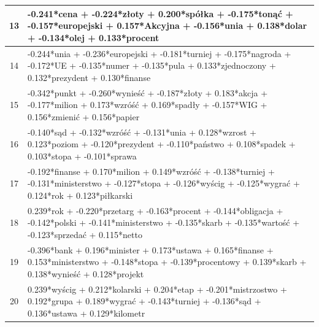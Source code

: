 \documentclass[11pt,a4paper]{article}
\begin{document}
\begin{table}[h]
\begin{tabular}{|c|>{\footnotesize}p{\linewidth}|}
13 & -0.241*cena + -0.224*złoty + 0.200*spółka + -0.175*tonąć + -0.157*europejski + 0.157*Akcyjna + -0.156*unia + 0.138*dolar + -0.134*olej + 0.133*procent\\\hline
14 & -0.244*unia + -0.236*europejski + -0.181*turniej + -0.175*nagroda + -0.172*UE + -0.135*numer + -0.135*pula + 0.133*zjednoczony + 0.132*prezydent + 0.130*finanse\\\hline
15 & -0.342*punkt + -0.260*wynieść + -0.187*złoty + 0.183*akcja + -0.177*milion + 0.173*wzróść + 0.169*spadły + -0.157*WIG + 0.156*zmienić + 0.156*papier\\\hline
16 & -0.140*sąd + -0.132*wzróść + -0.131*unia + 0.128*wzrost + 0.123*poziom + -0.120*prezydent + -0.110*państwo + 0.108*spadek + 0.103*stopa + -0.101*sprawa\\\hline
17 & -0.192*finanse + 0.170*milion + 0.149*wzróść + -0.138*turniej + -0.131*ministerstwo + -0.127*stopa + -0.126*wyścig + -0.125*wygrać + 0.124*rok + 0.123*piłkarski\\\hline
18 & 0.239*rok + -0.220*przetarg + -0.163*procent + -0.144*obligacja + -0.142*polski + -0.141*ministerstwo + -0.135*skarb + -0.135*wartość + -0.123*sprzedać + 0.115*netto\\\hline
19 & -0.396*bank + 0.196*minister + 0.173*ustawa + 0.165*finanse + 0.153*ministerstwo + -0.148*stopa + -0.139*procentowy + 0.139*skarb + 0.138*wynieść + 0.128*projekt\\\hline
20 & 0.239*wyścig + 0.212*kolarski + 0.204*etap + -0.201*mistrzostwo + 0.192*grupa + 0.189*wygrać + -0.143*turniej + -0.136*sąd + 0.136*ustawa + 0.129*kilometr\\\hline
\end{tabular}
\end{table}
\end{document}
